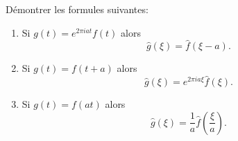 \medskip

\begin{exercice}

Démontrer les formules suivantes:
\begin{enumerate}
 \item Si $g(t) = e^{2\pi i a t} f(t)$ alors $$\hat{g}(\xi) = \hat{f} ( \xi - a).$$
 \item Si $g(t) = f(t + a)$ alors $$\hat{g}(\xi) = e^{2\pi i a \xi} \hat{f} ( \xi ).$$
 \item Si $g(t) = f(at)$ alors $$\hat{g}(\xi) = \frac1a \hat{f} \left ( \frac{\xi}{a} \right ).$$
\end{enumerate}

 
\end{exercice}



